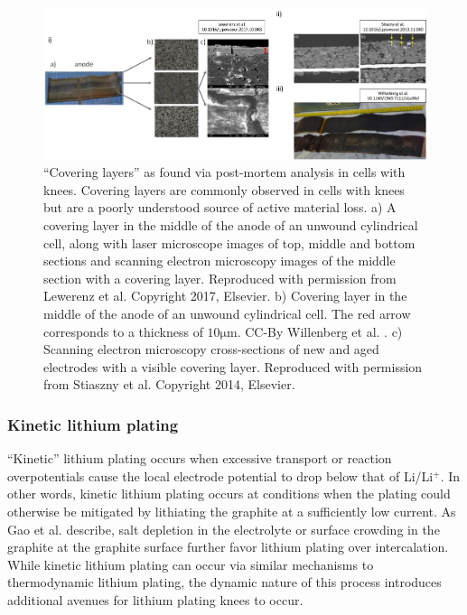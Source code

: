 \documentclass[journal=jpcl, manuscript=article, layout=onecolumn]{achemso}
\begin{document}
\begin{figure}[ht]
\centering
\includegraphics[scale = 0.5]{figures/CoveringLayers.pdf}
\caption{``Covering layers'' as found via post-mortem analysis in cells with knees. Covering layers are commonly observed in cells with knees but are a poorly understood source of active material loss.
a) A covering layer in the middle of the anode of an unwound cylindrical cell, along with laser microscope images of top, middle and bottom sections and scanning electron microscopy images of the middle section with a covering layer. Reproduced with permission from Lewerenz et al. \cite{lewerenz_post-mortem_2017} Copyright 2017, Elsevier. b) Covering layer in the middle of the anode of an unwound cylindrical cell. The red arrow corresponds to a thickness of $10 \mathrm{\mu m}$. CC-By Willenberg et al. \cite{willenberg_development_2020}. c) Scanning electron microscopy cross-sections of new and aged electrodes with a visible covering layer. Reproduced with permission from Stiaszny et al. \cite{stiaszny_electrochemical_2014} Copyright 2014, Elsevier.}
\label{fig:covering_layers}
\end{figure}

\subsubsection{Kinetic lithium plating}

``Kinetic'' lithium plating occurs when excessive transport or reaction overpotentials cause the local electrode potential to drop below that of Li/Li$\mathrm{^+}$.
In other words, kinetic lithium plating occurs at conditions when the plating could otherwise be mitigated by lithiating the graphite at a sufficiently low current. As Gao et al.\cite{gao_interplay_2021} describe, salt depletion in the electrolyte or surface crowding in the graphite at the graphite surface further favor lithium plating over intercalation. While kinetic lithium plating can occur via similar mechanisms to thermodynamic lithium plating, the dynamic nature of this process introduces additional avenues for lithium plating knees to occur.
\end{document}
